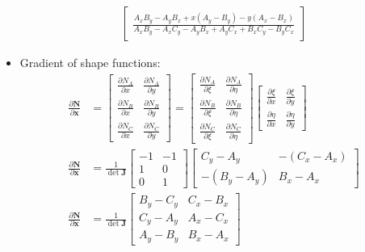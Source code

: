 \documentclass[10pt]{article}
\begin{document}
\begin{itemize}
\begin{align}
\begin{bmatrix}
                \frac{A_{x} B_{y} - A_{y} B_{x} + x \left(A_{y} - B_{y}\right) - y \left(A_{x} - B_{x}\right)}{A_{x} B_{y} - A_{x} C_{y} - A_{y} B_{x} + A_{y} C_{x} + B_{x} C_{y} - B_{y} C_{x}}
            \end{bmatrix}
        \end{align}
    \item Gradient of shape functions:
        \begin{align}
            \frac{\partial \mathbf{N}}{\partial \mathbf{x}}
            &=
            \begin{bmatrix}
                \frac{\partial N_A}{\partial x} & \frac{\partial N_A}{\partial y} \\
                \frac{\partial N_B}{\partial x} & \frac{\partial N_B}{\partial y} \\
                \frac{\partial N_C}{\partial x} & \frac{\partial N_C}{\partial y}
            \end{bmatrix}
            =
            \begin{bmatrix}
                \frac{\partial N_A}{\partial \xi} & \frac{\partial N_A}{\partial \eta} \\
                \frac{\partial N_B}{\partial \xi} & \frac{\partial N_B}{\partial \eta} \\
                \frac{\partial N_C}{\partial \xi} & \frac{\partial N_C}{\partial \eta}
            \end{bmatrix}
            \begin{bmatrix}
                \frac{\partial \xi}{\partial x} & \frac{\partial \xi}{\partial y} \\
                \frac{\partial \eta}{\partial x} & \frac{\partial \eta}{\partial y}
            \end{bmatrix} \\
            \frac{\partial \mathbf{N}}{\partial \mathbf{x}}
            &=
            \frac{1}{\det \mathbf{J}}
            \begin{bmatrix}
                -1 & -1 \\
                1 & 0 \\
                0 & 1
            \end{bmatrix}
            \begin{bmatrix}
                C_y - A_y & -(C_x - A_x) \\
                -(B_y - A_y) & B_x - A_x
            \end{bmatrix} \\
            \frac{\partial \mathbf{N}}{\partial \mathbf{x}}
            &=
            \frac{1}{\det \mathbf{J}}
            \begin{bmatrix}
                B_y - C_y & C_x - B_x \\
                C_y - A_y & A_x - C_x \\
                A_y - B_y & B_x - A_x
            \end{bmatrix}
        \end{align}
\end{itemize}
\end{document}
